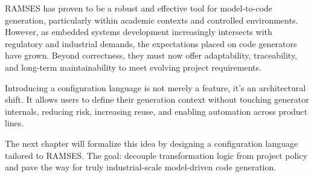 RAMSES has proven to be a robust and effective tool for model-to-code generation, particularly within academic contexts and controlled environments. However, as embedded systems development increasingly intersects with regulatory and industrial demands, the expectations placed on code generators have grown. Beyond correctness, they must now offer adaptability, traceability, and long-term maintainability to meet evolving project requirements.

Introducing a configuration language is not merely a feature, it's an architectural shift. It allows users to define their generation context without touching generator internals, reducing risk, increasing reuse, and enabling automation across product lines.

The next chapter will formalize this idea by designing a configuration language tailored to RAMSES. The goal: decouple transformation logic from project policy and pave the way for truly industrial-scale model-driven code generation.


